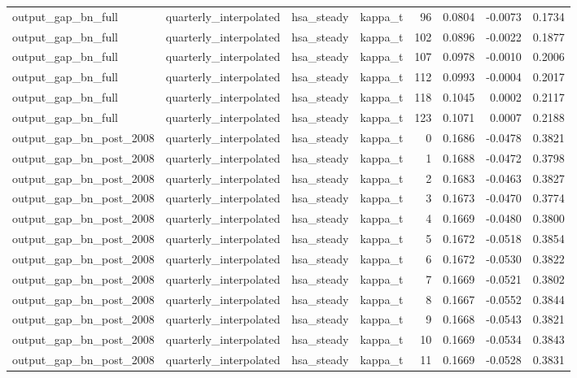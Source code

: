 \begin{tabular}{llllrrrr}
output\_gap\_bn\_full & quarterly\_interpolated & hsa\_steady & kappa\_t & 96 & 0.0804 & -0.0073 & 0.1734 \\
output\_gap\_bn\_full & quarterly\_interpolated & hsa\_steady & kappa\_t & 102 & 0.0896 & -0.0022 & 0.1877 \\
output\_gap\_bn\_full & quarterly\_interpolated & hsa\_steady & kappa\_t & 107 & 0.0978 & -0.0010 & 0.2006 \\
output\_gap\_bn\_full & quarterly\_interpolated & hsa\_steady & kappa\_t & 112 & 0.0993 & -0.0004 & 0.2017 \\
output\_gap\_bn\_full & quarterly\_interpolated & hsa\_steady & kappa\_t & 118 & 0.1045 & 0.0002 & 0.2117 \\
output\_gap\_bn\_full & quarterly\_interpolated & hsa\_steady & kappa\_t & 123 & 0.1071 & 0.0007 & 0.2188 \\
output\_gap\_bn\_post\_2008 & quarterly\_interpolated & hsa\_steady & kappa\_t & 0 & 0.1686 & -0.0478 & 0.3821 \\
output\_gap\_bn\_post\_2008 & quarterly\_interpolated & hsa\_steady & kappa\_t & 1 & 0.1688 & -0.0472 & 0.3798 \\
output\_gap\_bn\_post\_2008 & quarterly\_interpolated & hsa\_steady & kappa\_t & 2 & 0.1683 & -0.0463 & 0.3827 \\
output\_gap\_bn\_post\_2008 & quarterly\_interpolated & hsa\_steady & kappa\_t & 3 & 0.1673 & -0.0470 & 0.3774 \\
output\_gap\_bn\_post\_2008 & quarterly\_interpolated & hsa\_steady & kappa\_t & 4 & 0.1669 & -0.0480 & 0.3800 \\
output\_gap\_bn\_post\_2008 & quarterly\_interpolated & hsa\_steady & kappa\_t & 5 & 0.1672 & -0.0518 & 0.3854 \\
output\_gap\_bn\_post\_2008 & quarterly\_interpolated & hsa\_steady & kappa\_t & 6 & 0.1672 & -0.0530 & 0.3822 \\
output\_gap\_bn\_post\_2008 & quarterly\_interpolated & hsa\_steady & kappa\_t & 7 & 0.1669 & -0.0521 & 0.3802 \\
output\_gap\_bn\_post\_2008 & quarterly\_interpolated & hsa\_steady & kappa\_t & 8 & 0.1667 & -0.0552 & 0.3844 \\
output\_gap\_bn\_post\_2008 & quarterly\_interpolated & hsa\_steady & kappa\_t & 9 & 0.1668 & -0.0543 & 0.3821 \\
output\_gap\_bn\_post\_2008 & quarterly\_interpolated & hsa\_steady & kappa\_t & 10 & 0.1669 & -0.0534 & 0.3843 \\
output\_gap\_bn\_post\_2008 & quarterly\_interpolated & hsa\_steady & kappa\_t & 11 & 0.1669 & -0.0528 & 0.3831 \\

\end{tabular}
